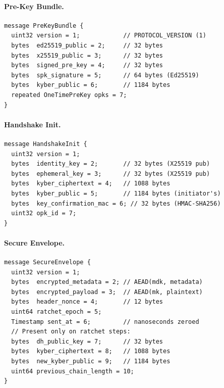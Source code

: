 \documentclass[11pt,a4paper]{article}
\theoremstyle{definition}
\begin{document}
\paragraph{Pre-Key Bundle.}
\begin{lstlisting}
message PreKeyBundle {
  uint32 version = 1;            // PROTOCOL_VERSION (1)
  bytes  ed25519_public = 2;     // 32 bytes
  bytes  x25519_public = 3;      // 32 bytes
  bytes  signed_pre_key = 4;     // 32 bytes
  bytes  spk_signature = 5;      // 64 bytes (Ed25519)
  bytes  kyber_public = 6;       // 1184 bytes
  repeated OneTimePreKey opks = 7;
}
\end{lstlisting}

\paragraph{Handshake Init.}
\begin{lstlisting}
message HandshakeInit {
  uint32 version = 1;
  bytes  identity_key = 2;       // 32 bytes (X25519 pub)
  bytes  ephemeral_key = 3;      // 32 bytes (X25519 pub)
  bytes  kyber_ciphertext = 4;   // 1088 bytes
  bytes  kyber_public = 5;       // 1184 bytes (initiator's)
  bytes  key_confirmation_mac = 6; // 32 bytes (HMAC-SHA256)
  uint32 opk_id = 7;
}
\end{lstlisting}

\paragraph{Secure Envelope.}
\begin{lstlisting}
message SecureEnvelope {
  uint32 version = 1;
  bytes  encrypted_metadata = 2; // AEAD(mdk, metadata)
  bytes  encrypted_payload = 3;  // AEAD(mk, plaintext)
  bytes  header_nonce = 4;       // 12 bytes
  uint64 ratchet_epoch = 5;
  Timestamp sent_at = 6;         // nanoseconds zeroed
  // Present only on ratchet steps:
  bytes  dh_public_key = 7;      // 32 bytes
  bytes  kyber_ciphertext = 8;   // 1088 bytes
  bytes  new_kyber_public = 9;   // 1184 bytes
  uint64 previous_chain_length = 10;
}
\end{lstlisting}
\end{document}
